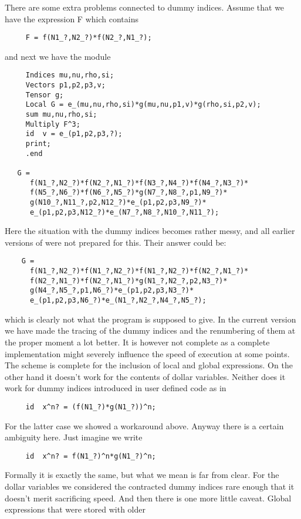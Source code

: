 There are some extra problems connected to dummy indices. Assume that we 
have the expression F which contains
\begin{verbatim}
     F = f(N1_?,N2_?)*f(N2_?,N1_?);
\end{verbatim}
and next we have the module
\begin{verbatim}
     Indices mu,nu,rho,si;
     Vectors p1,p2,p3,v;
     Tensor g;
     Local G = e_(mu,nu,rho,si)*g(mu,nu,p1,v)*g(rho,si,p2,v);
     sum mu,nu,rho,si;
     Multiply F^3;
     id  v = e_(p1,p2,p3,?);
     print;
     .end

   G =
      f(N1_?,N2_?)*f(N2_?,N1_?)*f(N3_?,N4_?)*f(N4_?,N3_?)*
      f(N5_?,N6_?)*f(N6_?,N5_?)*g(N7_?,N8_?,p1,N9_?)*
      g(N10_?,N11_?,p2,N12_?)*e_(p1,p2,p3,N9_?)*
      e_(p1,p2,p3,N12_?)*e_(N7_?,N8_?,N10_?,N11_?);
\end{verbatim}
Here the situation with the dummy indices becomes rather messy, and all 
earlier versions of {\FORM} were not prepared for this. Their answer could be:
\begin{verbatim}
    G =
      f(N1_?,N2_?)*f(N1_?,N2_?)*f(N1_?,N2_?)*f(N2_?,N1_?)*
      f(N2_?,N1_?)*f(N2_?,N1_?)*g(N1_?,N2_?,p2,N3_?)*
      g(N4_?,N5_?,p1,N6_?)*e_(p1,p2,p3,N3_?)*
      e_(p1,p2,p3,N6_?)*e_(N1_?,N2_?,N4_?,N5_?);
\end{verbatim}
which is clearly not what the program is supposed to give. In the current 
version we have made the tracing of the dummy indices and the renumbering 
of them at the proper moment a lot better. It is however not complete as a 
complete implementation might severely influence the speed of execution at 
some points. The scheme is complete for the inclusion of local and global 
expressions. On the other hand it doesn't work for the contents of dollar 
variables. Neither does it work for dummy indices 
introduced in user defined code as in
\begin{verbatim}
     id  x^n? = (f(N1_?)*g(N1_?))^n;
\end{verbatim}
For the latter case we showed a workaround above. Anyway there is a certain 
ambiguity here. Just imagine we write
\begin{verbatim}
     id  x^n? = f(N1_?)^n*g(N1_?)^n;
\end{verbatim}
Formally it is exactly the same, but what we mean is far from clear. For 
the dollar variables we considered the contracted dummy indices rare enough 
that it doesn't merit sacrificing speed. And then there is one more little 
caveat. Global expressions that were stored with older 
